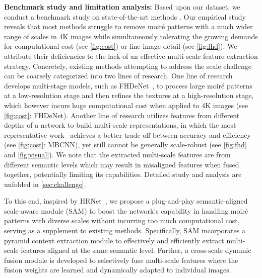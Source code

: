 \documentclass[runningheads]{llncs}
\begin{document}
\noindent\textbf{Benchmark study and limitation analysis:} Based upon our dataset, we conduct a benchmark study on state-of-the-art methods \cite{he2020fhde,zheng2020image,he2019mop,sun2018moire,liu2020wavelet,cheng2019multi}. 
Our empirical study reveals that most methods \cite{sun2018moire,cheng2019multi,zheng2020image} struggle to  remove moiré patterns with a much wider range of scales in 4K images while simultaneously tolerating the growing demands for computational cost (see \cref{fig:cost}) or fine image detail \cite{he2020fhde} (see \cref{fig:fhd}).
We attribute their deficiencies to the lack of an effective multi-scale feature extraction strategy.
Concretely, existing methods attempting to address the scale challenge can be coarsely categorized into two lines of research. One line of research develops multi-stage models, such as  FHDeNet~\cite{he2020fhde}, to process large moiré patterns at a low-resolution stage and then refines the textures at a high-resolution stage, which however incurs huge computational cost when applied to 4K images (see \cref{fig:cost}: FHDeNet). Another line of research utilizes features from different depths of a network to build multi-scale representations, in which the most representative work~\cite{zheng2020image} achieves a better trade-off between accuracy and efficiency (see \cref{fig:cost}: MBCNN), yet still cannot be generally scale-robust (see \cref{fig:fhd} and \cref{fig:visual}). We note that the extracted multi-scale features are from different semantic levels which may result in misaligned features when fused together, potentially limiting its capabilities.
Detailed study and analysis are unfolded in  \cref{sec:challenge}. 



To this end, inspired by HRNet~\cite{wang2020deep},
we propose a plug-and-play semantic-aligned scale-aware module (SAM) to boost the network's capability in handling moiré patterns with diverse scales without incurring too much computational cost, serving as a supplement to existing methods. Specifically, SAM incorporates a pyramid context extraction module to effectively and efficiently extract multi-scale features aligned at the same semantic level. Further, a cross-scale dynamic fusion module is developed to selectively fuse multi-scale features where the fusion weights are learned and dynamically adapted to individual images.
  
\end{document}
